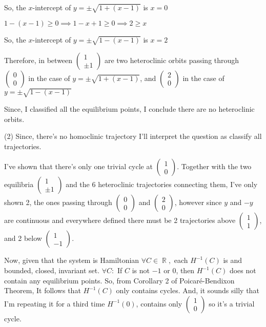 \documentclass{article}
\begin{document}
So, the $x$-intercept of $y = \pm \sqrt{1 + (x-1)}$ is $x = 0$

$1 - (x-1) \geq 0 \implies 1 -x + 1 \geq 0 \implies 2 \geq x$

So, the $x$-intercept of $y = \pm \sqrt{1 - (x-1)}$ is $x = 2$

Therefore, in between
$\begin{pmatrix}1\\ \pm 1\end{pmatrix}$ are two
heteroclinic orbits passing through
$\begin{pmatrix}0\\
  0\end{pmatrix}$ in the case of $y = \pm \sqrt{1 + (x-1)}$, and $\begin{pmatrix}2\\
  0\end{pmatrix}$ in the case of $y = \pm \sqrt{1 - (x-1)}$

Since, I classified all the equilibrium points, I conclude there are
no heteroclinic orbits.

(2) Since, there's no homoclinic trajectory I'll interpret the
question as classify all trajectories.

I've shown that there's only one trivial cycle at $\begin{pmatrix}1\\
  0\end{pmatrix}$. Together with the two equilibria $\begin{pmatrix}1\\
  \pm 1\end{pmatrix}$ and the 6
heteroclinic trajectories connecting them, I've only shown 2, the ones
passing through $\begin{pmatrix}0\\
  0\end{pmatrix}$ and $\begin{pmatrix}2\\
  0\end{pmatrix}$, however since $y$ and $-y$ are continuous and everywhere
defined there must be 2 trajectories above $\begin{pmatrix}1\\
  1\end{pmatrix}$, and 2 below $\begin{pmatrix}1\\
  -1\end{pmatrix}$.

Now, given that the system is Hamiltonian $\forall C \in \BbbR,$ each $H^{-1}(C)$ is
and bounded, closed, invariant set. $\forall C:$ If $C$ is not $-1$ or
$0$, then $H^{-1}(C)$ does not contain any equilibrium points. So,
from Corollary 2 of Poicaré-Bendixon Theorem, It follows that
$H^{-1}(C)$ only contains cycles. And, it sounds silly that I'm
repeating it for a third time $H^{-1}(0)$, contains only $\begin{pmatrix}1\\
  0\end{pmatrix}$ so it's a trivial cycle.
\end{document}
